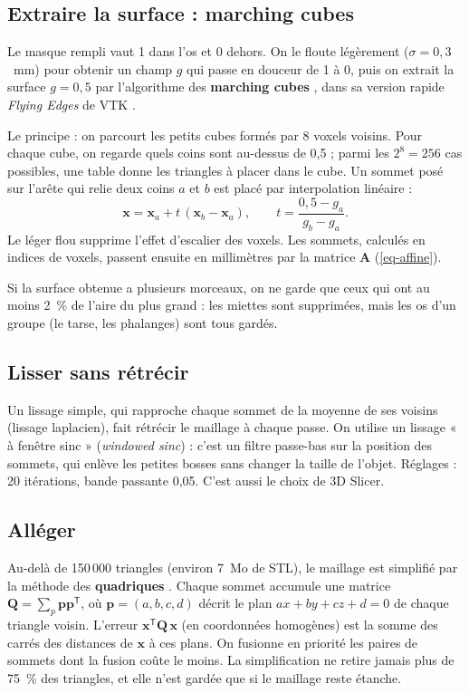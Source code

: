 \documentclass[11pt,a4paper]{article}
\newcommand{\vb}[1]{\mathbf{#1}}
\begin{document}
\subsection{Extraire la surface : marching cubes}

Le masque rempli vaut 1 dans l'os et 0 dehors. On le floute légèrement ($\sigma = 0{,}3$~mm) pour obtenir un champ $g$
qui passe en douceur de 1 à 0, puis on extrait la surface $g = 0{,}5$ par l'algorithme des \textbf{marching cubes}
\cite{lorensen1987}, dans sa version rapide \emph{Flying Edges} de VTK \cite{schroeder2015}.

Le principe : on parcourt les petits cubes formés par 8 voxels voisins. Pour chaque cube, on regarde quels coins sont
au-dessus de 0,5 ; parmi les $2^8 = 256$ cas possibles, une table donne les triangles à placer dans le cube. Un sommet
posé sur l'arête qui relie deux coins $a$ et $b$ est placé par interpolation linéaire :
\begin{equation}
  \vb{x} = \vb{x}_a + t\,(\vb{x}_b - \vb{x}_a), \qquad t = \frac{0{,}5 - g_a}{g_b - g_a}.
\end{equation}
Le léger flou supprime l'effet d'escalier des voxels. Les sommets, calculés en indices de voxels, passent ensuite en
millimètres par la matrice $\vb{A}$ (\cref{eq-affine}).

Si la surface obtenue a plusieurs morceaux, on ne garde que ceux qui ont au moins 2~\% de l'aire du plus grand : les
miettes sont supprimées, mais les os d'un groupe (le tarse, les phalanges) sont tous gardés.

\subsection{Lisser sans rétrécir}

Un lissage simple, qui rapproche chaque sommet de la moyenne de ses voisins (lissage laplacien), fait rétrécir le
maillage à chaque passe. On utilise un lissage « à fenêtre sinc » (\emph{windowed sinc}) \cite{taubin1995} :
c'est un filtre passe-bas sur la position des sommets, qui enlève les petites bosses sans changer la taille de
l'objet. Réglages : 20 itérations, bande passante 0,05. C'est aussi le choix de 3D Slicer.

\subsection{Alléger}

Au-delà de 150\,000 triangles (environ 7~Mo de STL), le maillage est simplifié par la méthode des \textbf{quadriques}
\cite{garland1997}. Chaque sommet accumule une matrice $\vb{Q} = \sum_p \vb{p}\vb{p}^{\mathsf T}$, où
$\vb{p} = (a, b, c, d)$ décrit le plan $ax + by + cz + d = 0$ de chaque triangle voisin. L'erreur
$\vb{x}^{\mathsf T}\vb{Q}\,\vb{x}$ (en coordonnées homogènes) est la somme des carrés des distances de $\vb{x}$ à ces
plans. On fusionne en priorité les paires de sommets dont la fusion coûte le moins. La simplification ne retire jamais
plus de 75~\% des triangles, et elle n'est gardée que si le maillage reste étanche.
\end{document}
